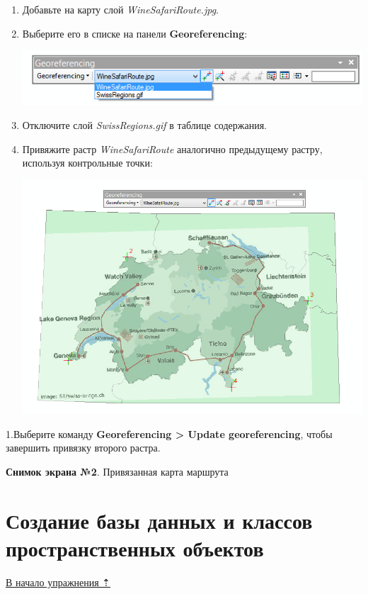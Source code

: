 \documentclass[]{book}
\theoremstyle{definition}
\theoremstyle{definition}
\theoremstyle{definition}
\theoremstyle{remark}
\begin{document}
\begin{enumerate}
\def\labelenumi{\arabic{enumi}.}
\item
  Добавьте на карту слой \emph{WineSafariRoute.jpg}.
\item
  Выберите его в списке на панели \textbf{Georeferencing}:

  \includegraphics{images/Ex05/image12.png}
\item
  Отключите слой \emph{SwissRegions.gif} в таблице содержания.
\item
  Привяжите растр \emph{WineSafariRoute} аналогично предыдущему растру,
  используя контрольные точки:

  \includegraphics{images/Ex05/image13.png}
\end{enumerate}

1.Выберите команду \textbf{Georeferencing \textgreater{} Update
georeferencing}, чтобы завершить привязку второго растра.

\textbf{Снимок экрана №2}. Привязанная карта маршрута

\hypertarget{map-ref-general-geodatabase}{%
\section{Создание базы данных и классов пространственных
объектов}\label{map-ref-general-geodatabase}}

\protect\hyperlink{map-ref-general}{В начало упражнения ⇡}
\end{document}
